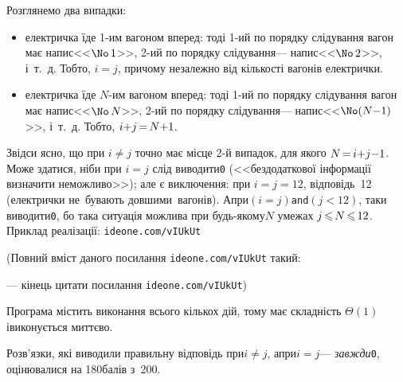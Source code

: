 \documentclass[14pt,a4paper]{extarticle}
\def\dib#1{\,#1\discretionary{}{\mbox{$#1$}}{}\,}
\renewcommand{\baselinestretch}{1.3125}
\begin{document}
\Tutorial	Розглянемо два випадки: 

\begin{itemize}[leftmargin=*,itemsep=0pt,partopsep=0pt,topsep=0pt,parsep=0pt]
\item
електричка їде \mbox{1-им} вагоном вперед: тоді 
\mbox{1-ий} по порядку слідування вагон має напис\nolinebreak[2] <<$\No\,1$>>, 
\mbox{2-ий} по порядку слідування\nolinebreak[3] --- напис\nolinebreak[2] <<$\No\,2$>>, 
і~т.~д. Тобто, ${i{=}j}$, причому незалежно від кількості вагонів електрички.
\item
електричка їде \mbox{$N$-им} вагоном вперед: тоді 
\mbox{1-ий} по порядку слідування вагон має напис\nolinebreak[2] <<$\No\,N$>>, 
\mbox{2-ий} по порядку слідування\nolinebreak[3] --- напис\nolinebreak[2] <<$\No(N{-}1)$>>, 
і~т.~д. Тобто, ${i{+}j}\dib{{=}}{N{+}1}$.
\end{itemize}

Звідси ясно, що при $i{\neq}j$ точно має місце \mbox{2-й} випадок, для якого $N\dib{{=}}{i{+}j{-}1}$. Може здатися, ніби при $i{=}j$ слід виводити\nolinebreak[3] \texttt{0} (<<без\nolinebreak[1] додаткової інформації визначити неможливо>>); але є виключення: при $i{=}j{=}12$, відповідь~12 (електрички не~бувають довшими~вагонів). А\nolinebreak[3] при\nolinebreak[1] $({i{=}j})$\nolinebreak[3] \texttt{and}\nolinebreak[2] $({j{<}12})$, таки виводити\nolinebreak[3] \texttt{0}, бо така ситуація можлива при будь-якому\nolinebreak[3] $N$ 
у\nolinebreak[3] межах $j\dib{{\<}}N\dib{{\<}}12$.
Приклад реалізації: 
\verb"ideone.com/vIUkUt"


{\color{green}\begin{small}

\renewcommand{\baselinestretch}{0.875}

(Повний вміст даного посилання \verb"ideone.com/vIUkUt" такий:

--- кінець цитати посилання \verb"ideone.com/vIUkUt")

\end{small}}


\hspace{0.5em plus 1em}
Програма містить виконання всього кількох дій, тому має складність $\Theta(1)$ і\nolinebreak[3] виконується миттєво.

Розв'язки, які виводили правильну відповідь при\nolinebreak[2] $i{\neq}j$, а\nolinebreak[3] при\nolinebreak[2]  $i{=}j$\nolinebreak[3] --- \emph{завжди}\nolinebreak[3] \texttt{0}, оцінювалися на 180\nolinebreak[3] балів з~200.
\end{document}
